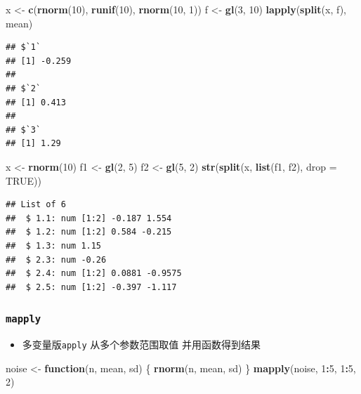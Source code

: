 \documentclass[]{book}
\newenvironment{Shaded}{\begin{snugshade}}{\end{snugshade}}
\newcommand{\ControlFlowTok}[1]{\textcolor[rgb]{0.13,0.29,0.53}{\textbf{#1}}}
\newcommand{\DataTypeTok}[1]{\textcolor[rgb]{0.13,0.29,0.53}{#1}}
\newcommand{\DecValTok}[1]{\textcolor[rgb]{0.00,0.00,0.81}{#1}}
\newcommand{\KeywordTok}[1]{\textcolor[rgb]{0.13,0.29,0.53}{\textbf{#1}}}
\newcommand{\NormalTok}[1]{#1}
\newcommand{\OperatorTok}[1]{\textcolor[rgb]{0.81,0.36,0.00}{\textbf{#1}}}
\newcommand{\OtherTok}[1]{\textcolor[rgb]{0.56,0.35,0.01}{#1}}
\newcommand{\StringTok}[1]{\textcolor[rgb]{0.31,0.60,0.02}{#1}}
\providecommand{\tightlist}{%
  \setlength{\itemsep}{0pt}\setlength{\parskip}{0pt}}
\begin{document}
\begin{Shaded}
\begin{Highlighting}[]
\NormalTok{x <-}\StringTok{ }\KeywordTok{c}\NormalTok{(}\KeywordTok{rnorm}\NormalTok{(}\DecValTok{10}\NormalTok{), }\KeywordTok{runif}\NormalTok{(}\DecValTok{10}\NormalTok{), }\KeywordTok{rnorm}\NormalTok{(}\DecValTok{10}\NormalTok{, }\DecValTok{1}\NormalTok{))}
\NormalTok{f <-}\StringTok{ }\KeywordTok{gl}\NormalTok{(}\DecValTok{3}\NormalTok{, }\DecValTok{10}\NormalTok{)}
\KeywordTok{lapply}\NormalTok{(}\KeywordTok{split}\NormalTok{(x, f), mean)}
\end{Highlighting}
\end{Shaded}

\begin{verbatim}
## $`1`
## [1] -0.259
## 
## $`2`
## [1] 0.413
## 
## $`3`
## [1] 1.29
\end{verbatim}

\begin{Shaded}
\begin{Highlighting}[]
\NormalTok{x <-}\StringTok{ }\KeywordTok{rnorm}\NormalTok{(}\DecValTok{10}\NormalTok{)}
\NormalTok{f1 <-}\StringTok{ }\KeywordTok{gl}\NormalTok{(}\DecValTok{2}\NormalTok{, }\DecValTok{5}\NormalTok{)}
\NormalTok{f2 <-}\StringTok{ }\KeywordTok{gl}\NormalTok{(}\DecValTok{5}\NormalTok{, }\DecValTok{2}\NormalTok{)}
\KeywordTok{str}\NormalTok{(}\KeywordTok{split}\NormalTok{(x, }\KeywordTok{list}\NormalTok{(f1, f2), }\DataTypeTok{drop =} \OtherTok{TRUE}\NormalTok{))}
\end{Highlighting}
\end{Shaded}

\begin{verbatim}
## List of 6
##  $ 1.1: num [1:2] -0.187 1.554
##  $ 1.2: num [1:2] 0.584 -0.215
##  $ 1.3: num 1.15
##  $ 2.3: num -0.26
##  $ 2.4: num [1:2] 0.0881 -0.9575
##  $ 2.5: num [1:2] -0.397 -1.117
\end{verbatim}

\hypertarget{mapply}{%
\subsubsection{\texorpdfstring{\texttt{mapply}}{mapply}}\label{mapply}}

\begin{itemize}
\tightlist
\item
  多变量版\texttt{apply} 从多个参数范围取值 并用函数得到结果
\end{itemize}

\begin{Shaded}
\begin{Highlighting}[]
\NormalTok{noise <-}\StringTok{ }\ControlFlowTok{function}\NormalTok{(n, mean, sd) \{}
  \KeywordTok{rnorm}\NormalTok{(n, mean, sd)}
\NormalTok{\}}
\KeywordTok{mapply}\NormalTok{(noise, }\DecValTok{1}\OperatorTok{:}\DecValTok{5}\NormalTok{, }\DecValTok{1}\OperatorTok{:}\DecValTok{5}\NormalTok{, }\DecValTok{2}\NormalTok{)}
\end{Highlighting}
\end{Shaded}
\end{document}
